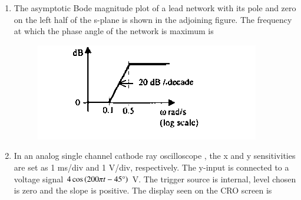 \documentclass[journal,12pt,onecolumn]{IEEEtran}
\theoremstyle{remark}
\begin{document}
\begin{enumerate}
\hfill{}\begin{enumerate}  \end{enumerate}



\item The asymptotic Bode magnitude plot of a lead network with its pole and zero on the left half of the s-plane is shown in the adjoining figure. The frequency at which the phase angle of the network is maximum  is
\begin{figure}[H]
    \centering
    \includegraphics[width = 0.7\columnwidth]{q37}
    \caption*{}
    \label{Q37}
\end{figure}

\hfill{}
\begin{enumerate} 
 \end{enumerate}

\item In an analog single channel cathode ray oscilloscope , the x and y sensitivities are set as 1 ms/div and 1 V/div, respectively. The y-input is connected to a voltage signal $4 \cos\left(200\pi t - 45\degree\right)$ V. The trigger source is internal, level chosen is zero and the slope is positive. The display seen on the CRO screen is


\end{enumerate}
\end{document}
